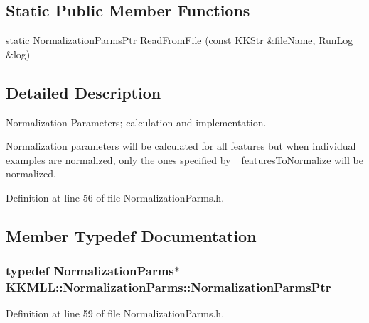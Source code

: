 \subsection*{Static Public Member Functions}
\begin{DoxyCompactItemize}
\item 
static \hyperlink{class_k_k_m_l_l_1_1_normalization_parms_ab326a259979eaf51a6396d19430b1259}{Normalization\+Parms\+Ptr} \hyperlink{class_k_k_m_l_l_1_1_normalization_parms_ae8834c5ff97d32313a4dfba2dc892bfa}{Read\+From\+File} (const \hyperlink{class_k_k_b_1_1_k_k_str}{K\+K\+Str} \&file\+Name, \hyperlink{class_k_k_b_1_1_run_log}{Run\+Log} \&log)
\end{DoxyCompactItemize}


\subsection{Detailed Description}
Normalization Parameters; calculation and implementation. 

Normalization parameters will be calculated for all features but when individual examples are normalized, only the ones specified by \+\_\+features\+To\+Normalize\textquotesingle{} will be normalized. 

Definition at line 56 of file Normalization\+Parms.\+h.



\subsection{Member Typedef Documentation}
\subsubsection[{\texorpdfstring{Normalization\+Parms\+Ptr}{NormalizationParmsPtr}}]{\setlength{\rightskip}{0pt plus 5cm}typedef {\bf Normalization\+Parms}$\ast$ {\bf K\+K\+M\+L\+L\+::\+Normalization\+Parms\+::\+Normalization\+Parms\+Ptr}}\hypertarget{class_k_k_m_l_l_1_1_normalization_parms_ab326a259979eaf51a6396d19430b1259}{}\label{class_k_k_m_l_l_1_1_normalization_parms_ab326a259979eaf51a6396d19430b1259}


Definition at line 59 of file Normalization\+Parms.\+h.



